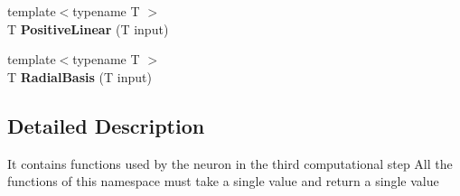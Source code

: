 \begin{DoxyCompactItemize}
\item 
\hypertarget{namespace_transfer_functions_a979551c123dc84b2bb2907fca94ea945}{{\footnotesize template$<$typename T $>$ }\\T {\bfseries Positive\-Linear} (T input)}\label{namespace_transfer_functions_a979551c123dc84b2bb2907fca94ea945}

\item 
\hypertarget{namespace_transfer_functions_a20953b42a150ac8c6f482831cabb097f}{{\footnotesize template$<$typename T $>$ }\\T {\bfseries Radial\-Basis} (T input)}\label{namespace_transfer_functions_a20953b42a150ac8c6f482831cabb097f}

\end{DoxyCompactItemize}


\subsection{Detailed Description}
It contains functions used by the neuron in the third computational step All the functions of this namespace must take a single value and return a single value 